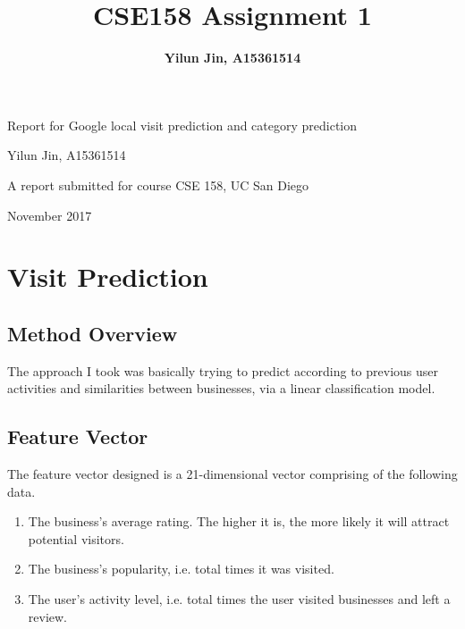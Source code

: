 \documentclass{article}
\title{\bf CSE158 Assignment 1}
\author{\bf Yilun Jin, A15361514}
\begin{document}
\thispagestyle{empty}
\begin{center}
\begin{minipage}{0.75\linewidth}
    \centering


	\vspace{4cm}
    {{\LARGE Report for Google local visit prediction and category prediction\par}}
    \vspace{4cm}
    {\Large Yilun Jin, A15361514\par}
    \vspace{4cm}
    {\Large A report submitted for course CSE 158, UC San Diego\par}
    \vspace{4cm}
    {\Large November 2017}
\end{minipage}
\end{center}
\clearpage


\section{Visit Prediction}
\subsection{Method Overview}
The approach I took was basically trying to predict according to previous user activities and similarities between businesses, via a linear classification model. 

\subsection{Feature Vector}
The feature vector designed is a 21-dimensional vector comprising of the following data. 
\begin{enumerate}
\item The business's average rating. The higher it is, the more likely it will attract potential visitors. 
\item The business's popularity, i.e. total times it was visited. 
\item The user's activity level, i.e. total times the user visited businesses and left a review. 
\end{enumerate}
\end{document}
